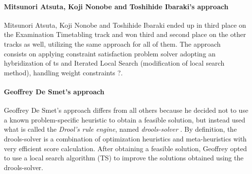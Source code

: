 

\paragraph{Mitsunori Atsuta, Koji Nonobe and Toshihide Ibaraki's approach}
Mitsunori Atsuta, Koji Nonobe and Toshihide Ibaraki ended up in third place on the Examination Timetabling track and won third and second place on the other tracks as well, utilizing the same approach for all of them. The approach~\cite{Atsuta2007} consists on applying constraint satisfaction problem solver adopting an hybridization of \gls{ts} and Iterated Local Search (modification of local search method), handling weight constraints {\color{red} ?}.\\

\paragraph{Geoffrey De Smet's approach}
Geoffrey De Smet's approach \cite{Smet2007} differs from all others because he decided not to use a known problem-specific heuristic to obtain a feasible solution, but instead used what is called the \textit{Drool's rule engine}, named \textit{drools-solver} \cite{Drools}. By definition, the drools-solver is a combination of optimization heuristics and meta-heuristics with very efficient score calculation. After obtaining a feasible solution, Geoffrey opted to use a local search algorithm (TS) to improve the solutions obtained using the drools-solver.\\

